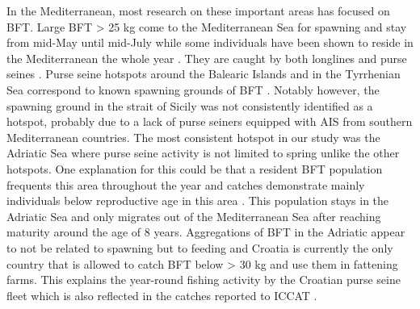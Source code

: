 In the Mediterranean, most research on these important areas has focused on BFT\@. Large BFT > 25
kg come to the Mediterranean Sea for spawning and stay from mid-May until mid-July while some
individuals have been shown to reside in the Mediterranean the whole year \citep{bft_mig_med}. They
are caught by both longlines and purse seines \citep{iccat_bft_summary}. Purse seine hotspots
around the Balearic Islands and in the Tyrrhenian Sea correspond to known spawning grounds of BFT
\citep{medina_spawning}. Notably however, the spawning ground in the strait of Sicily was not
consistently identified as a hotspot, probably due to a lack of purse seiners equipped with AIS
from southern Mediterranean countries. The most consistent hotspot in our study was the Adriatic
Sea where purse seine activity is not limited to spring unlike the other hotspots. One explanation
for this could be that a resident BFT population frequents this area throughout the year and
catches demonstrate mainly individuals below reproductive age in this area
\citep{iccat_bft_catches_adria}. This population stays in the Adriatic Sea and only migrates out of
the Mediterranean Sea after reaching maturity around the age of 8 years. Aggregations of BFT in the
Adriatic appear to not be related to spawning but to feeding and Croatia is currently the only
country that is allowed to catch BFT below > 30 kg and use them in fattening farms. This explains
the year-round fishing activity by the Croatian purse seine fleet which is also reflected in the
catches reported to ICCAT .

\medskip

